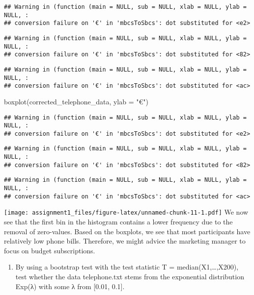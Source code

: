 \documentclass[
]{article}
\newenvironment{Shaded}{\begin{snugshade}}{\end{snugshade}}
\newcommand{\AttributeTok}[1]{\textcolor[rgb]{0.77,0.63,0.00}{#1}}
\newcommand{\FunctionTok}[1]{\textcolor[rgb]{0.00,0.00,0.00}{#1}}
\newcommand{\NormalTok}[1]{#1}
\newcommand{\StringTok}[1]{\textcolor[rgb]{0.31,0.60,0.02}{#1}}
\providecommand{\tightlist}{%
  \setlength{\itemsep}{0pt}\setlength{\parskip}{0pt}}
\begin{document}
\begin{verbatim}
## Warning in (function (main = NULL, sub = NULL, xlab = NULL, ylab = NULL, :
## conversion failure on '€' in 'mbcsToSbcs': dot substituted for <e2>
\end{verbatim}

\begin{verbatim}
## Warning in (function (main = NULL, sub = NULL, xlab = NULL, ylab = NULL, :
## conversion failure on '€' in 'mbcsToSbcs': dot substituted for <82>
\end{verbatim}

\begin{verbatim}
## Warning in (function (main = NULL, sub = NULL, xlab = NULL, ylab = NULL, :
## conversion failure on '€' in 'mbcsToSbcs': dot substituted for <ac>
\end{verbatim}

\begin{Shaded}
\begin{Highlighting}[]
\FunctionTok{boxplot}\NormalTok{(corrected\_telephone\_data, }\AttributeTok{ylab =} \StringTok{"€"}\NormalTok{)}
\end{Highlighting}
\end{Shaded}

\begin{verbatim}
## Warning in (function (main = NULL, sub = NULL, xlab = NULL, ylab = NULL, :
## conversion failure on '€' in 'mbcsToSbcs': dot substituted for <e2>
\end{verbatim}

\begin{verbatim}
## Warning in (function (main = NULL, sub = NULL, xlab = NULL, ylab = NULL, :
## conversion failure on '€' in 'mbcsToSbcs': dot substituted for <82>
\end{verbatim}

\begin{verbatim}
## Warning in (function (main = NULL, sub = NULL, xlab = NULL, ylab = NULL, :
## conversion failure on '€' in 'mbcsToSbcs': dot substituted for <ac>
\end{verbatim}

\texttt{[image: assignment1\_files/figure-latex/unnamed-chunk-11-1.pdf]}
We now see that the first bin in the histogram contains a lower
frequency due to the removal of zero-values. Based on the boxplots, we
see that most participants have relatively low phone bills. Therefore,
we might advice the marketing manager to focus on budget subscriptions.

\begin{enumerate}
\def\labelenumi{\alph{enumi})}
\setcounter{enumi}{1}
\tightlist
\item
  By using a bootstrap test with the test statistic T =
  median(X1,\ldots,X200), test whether the data telephone.txt stems from
  the exponential distribution Exp(λ) with some λ from {[}0.01, 0.1{]}.
\end{enumerate}
\end{document}

